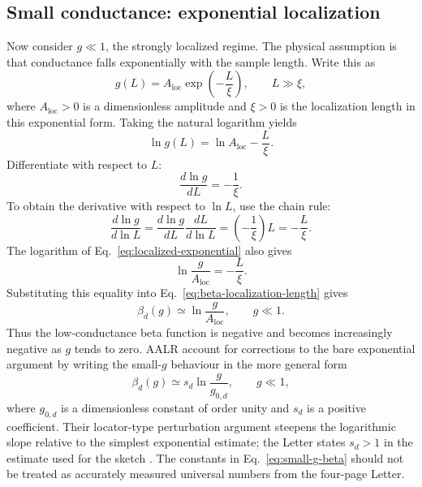\documentclass[11pt,a4paper]{article}
\numberwithin{equation}{section}
\begin{document}
\subsection{Small conductance: exponential localization}

Now consider $g\ll 1$, the strongly localized regime. The physical assumption is that conductance falls exponentially with the sample length. Write this as
\begin{equation}
    g(L)=A_{\mathrm{loc}}\exp\left(-\frac{L}{\xi}\right),
    \qquad L\gg \xi,
    \label{eq:localized-exponential}
\end{equation}
where $A_{\mathrm{loc}}>0$ is a dimensionless amplitude and $\xi>0$ is the localization length in this exponential form. Taking the natural logarithm yields
\begin{equation}
    \ln g(L)=\ln A_{\mathrm{loc}}-\frac{L}{\xi}.
\end{equation}
Differentiate with respect to $L$:
\begin{equation}
    \frac{d\ln g}{dL}=-\frac{1}{\xi}.
\end{equation}
To obtain the derivative with respect to $\ln L$, use the chain rule:
\begin{equation}
    \frac{d\ln g}{d\ln L}
    =\frac{d\ln g}{dL}\frac{dL}{d\ln L}
    =\left(-\frac{1}{\xi}\right)L
    =-\frac{L}{\xi}.
    \label{eq:beta-localization-length}
\end{equation}
The logarithm of Eq.~\eqref{eq:localized-exponential} also gives
\begin{equation}
    \ln\frac{g}{A_{\mathrm{loc}}}=-\frac{L}{\xi}.
\end{equation}
Substituting this equality into Eq.~\eqref{eq:beta-localization-length} gives
\begin{equation}
    \beta_d(g)\simeq\ln\frac{g}{A_{\mathrm{loc}}},
    \qquad g\ll1.
    \label{eq:small-g-leading}
\end{equation}
Thus the low-conductance beta function is negative and becomes increasingly negative as $g$ tends to zero. AALR account for corrections to the bare exponential argument by writing the small-$g$ behaviour in the more general form
\begin{equation}
    \beta_d(g)\simeq s_d\ln\frac{g}{g_{0,d}},
    \qquad g\ll1,
    \label{eq:small-g-beta}
\end{equation}
where $g_{0,d}$ is a dimensionless constant of order unity and $s_d$ is a positive coefficient. Their locator-type perturbation argument steepens the logarithmic slope relative to the simplest exponential estimate; the Letter states $s_d>1$ in the estimate used for the sketch \cite{AALR1979}. The constants in Eq.~\eqref{eq:small-g-beta} should not be treated as accurately measured universal numbers from the four-page Letter.
\end{document}
